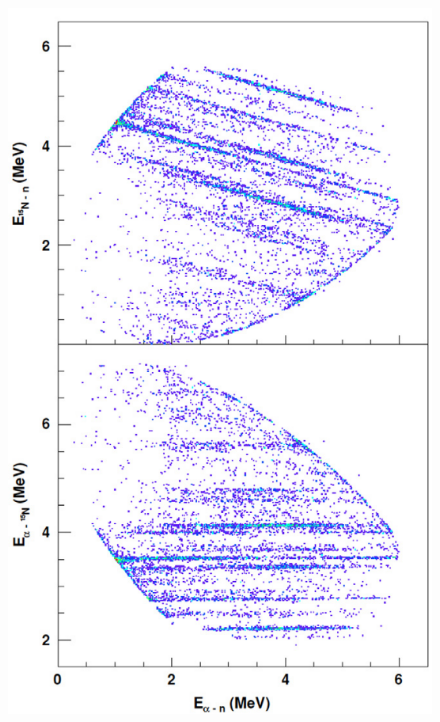 \begin{enumerate}
\begin{figure}[!h]
		\includegraphics[scale=0.5]{Immagini/0421_eng.png}

\end{figure}
\end{enumerate}
